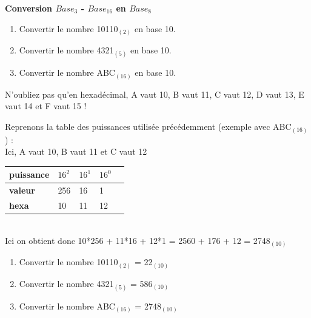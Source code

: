 \begin{Exercice}[15 minutes] \textbf{Conversion $Base_{3}$ - $Base_{16}$ en $Base_8$}
    \begin{enumerate}
        \item Convertir le nombre 10110$_{(2)}$ en base 10.
        \item Convertir le nombre 4321$_{(5)}$ en base 10.
        \item Convertir le nombre ABC$_{(16)}$ en base 10.
    \end{enumerate}
    \begin{conseil}
        
        N'oubliez pas qu'en hexadécimal, A vaut 10, B vaut 11, C vaut 12, D vaut 13, E vaut 14 et F vaut 15 ! \\
    \end{conseil}
    \begin{solution}
        Reprenons la table des puissances utilisée précédemment (exemple avec ABC$_{(16)}$) : \\
        
        Ici, A vaut 10, B vaut 11 et C vaut 12 \\
        
        \begin{tabular}{| C{0.1\textwidth} | C{0.1\textwidth} | C{0.1\textwidth} | C{0.1\textwidth} | C{0.1\textwidth} |} 
            \hline
            \textbf{puissance} & $16^{2}$ & $16^{1}$ & $16^{0}$ \\ [0.5ex] 
            \hline
            \textbf{valeur} & 256 & 16 & 1 \\ [0.5ex] 
            \hline
            \textbf{hexa} & 10 & 11 & 12 \\ [0.5ex] 
            \hline
        \end{tabular} \\
        
        Ici on obtient donc 10*256 + 11*16 + 12*1 = 2560 + 176 + 12 = 2748$_{(10)}$ \\
        
        \begin{enumerate}
        \item Convertir le nombre 10110$_{(2)}$  = 22$_{(10)}$
        \item Convertir le nombre 4321$_{(5)}$ = 586$_{(10)}$
        \item Convertir le nombre ABC$_{(16)}$ = 2748$_{(10)}$
        \end{enumerate}
    
    \end{solution}

\end{Exercice}
\newpage

